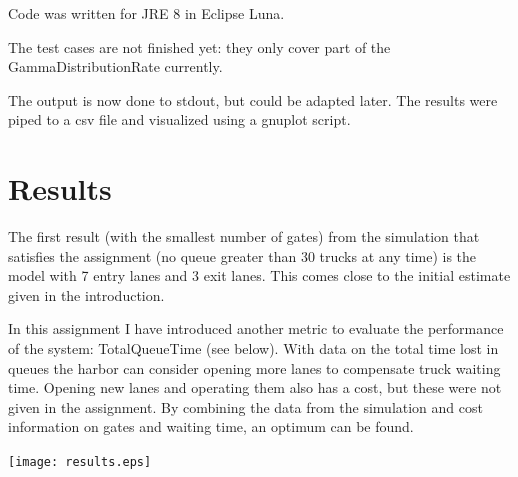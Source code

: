 \documentclass{article}
\begin{document}
Code was written for JRE 8 in Eclipse Luna.

The test cases are not finished yet: they only cover part of the
GammaDistributionRate currently.

The output is now done to stdout, but could be adapted later. The
results were piped to a csv file and visualized using a gnuplot
script.

\pagebreak
\section{Results}

The first result (with the smallest number of gates) from the
simulation that satisfies the assignment (no queue greater than 30
trucks at any time) is the model with 7 entry lanes and 3 exit
lanes. This comes close to the initial estimate given in the
introduction.

In this assignment I have introduced another metric to evaluate the
performance of the system: TotalQueueTime (see below). With
data on the total time lost in queues the harbor can consider opening
more lanes to compensate truck waiting time. Opening new lanes and
operating them also has a cost, but these were not given in the
assignment. By combining the data from the simulation and cost
information on gates and waiting time, an optimum can be found.

\texttt{[image: results.eps]}
\end{document}
